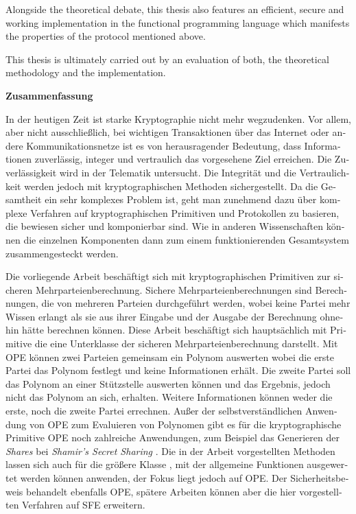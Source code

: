 Alongside the theoretical debate, this thesis also features an efficient, secure
and working implementation in the functional programming language \JWThaskell{}
which manifests the properties of the protocol mentioned above.

This thesis is ultimately carried out by an evaluation of both, the theoretical
methodology and the implementation.

\cleardoublepage

\noindent{}\textsf{\textbf{\huge Zusammenfassung}}

\bigskip{}
\begin{otherlanguage}{ngerman}

\noindent{}In der heutigen Zeit ist starke Kryptographie nicht mehr wegzudenken.
Vor allem, aber nicht ausschließlich, bei wichtigen Transaktionen über das
Internet oder andere Kommunikationsnetze ist es von herausragender Bedeutung,
dass Informationen zuverlässig, integer und vertraulich das vorgesehene Ziel
erreichen. Die Zuverlässigkeit wird in der Telematik untersucht. Die Integrität
und die Vertraulichkeit werden jedoch mit kryptographischen Methoden
sichergestellt. Da die Gesamtheit ein sehr komplexes Problem ist, geht man
zunehmend dazu über komplexe Verfahren auf kryptographischen Primitiven und
Protokollen zu basieren, die bewiesen sicher und komponierbar sind. Wie in
anderen Wissenschaften können die einzelnen Komponenten dann zum einem
funktionierenden Gesamtsystem zusammengesteckt werden.

Die vorliegende Arbeit beschäftigt sich mit kryptographischen Primitiven zur
sicheren Mehrparteienberechnung. Sichere Mehrparteienberechnungen sind
Berechnungen, die von mehreren Parteien durchgeführt werden, wobei keine Partei
mehr Wissen erlangt als sie aus ihrer Eingabe und der Ausgabe der Berechnung
ohnehin hätte berechnen können. Diese Arbeit beschäftigt sich hauptsächlich mit
Primitive  die eine Unterklasse
der sicheren Mehrparteienberechnung darstellt. Mit OPE können zwei Parteien
gemeinsam ein Polynom auswerten wobei die erste Partei das Polynom festlegt und
keine Informationen erhält. Die zweite Partei soll das Polynom an einer
Stützstelle auswerten können und das Ergebnis, jedoch nicht das Polynom an sich,
erhalten. Weitere Informationen können weder die erste, noch die zweite Partei
errechnen. Außer der selbstverständlichen Anwendung von OPE zum Evaluieren von
Polynomen gibt es für die kryptographische Primitive OPE noch zahlreiche
Anwendungen, zum Beispiel das Generieren der \emph{Shares} bei \emph{Shamir's
Secret Sharing} \cite{shamir79}. Die in der Arbeit vorgestellten Methoden lassen
sich auch für die größere Klasse , mit
der allgemeine Funktionen ausgewertet werden können anwenden, der Fokus liegt
jedoch auf OPE. Der Sicherheitsbeweis behandelt ebenfalls OPE, spätere Arbeiten
können aber die hier vorgestellten Verfahren auf SFE erweitern.


\end{otherlanguage}
